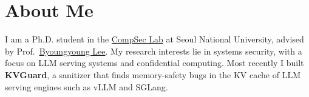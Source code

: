 \section{About Me}

I am a Ph.D. student in the \href{https://compsec.snu.ac.kr}{CompSec Lab} at
Seoul National University, advised by Prof.\
\href{https://lifeasageek.github.io}{Byoungyoung Lee}. My research interests
lie in systems security, with a focus on LLM serving systems and confidential
computing. Most recently I built \textbf{KVGuard}, a sanitizer that finds
memory-safety bugs in the KV cache of LLM serving engines such as vLLM and
SGLang.

